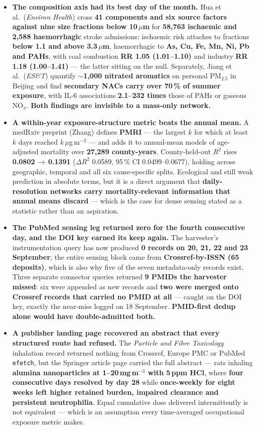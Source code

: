 \documentclass[10pt]{article}
\begin{document}
\begin{itemize}
\item \textbf{The composition axis had its best day of the month.} Hua et al.\
(\textit{Environ Health}) cross \textbf{41 components and six source factors against nine
size fractions below 10\,$\mu$m} for \textbf{58,763 ischaemic and 2,588 haemorrhagic}
stroke admissions: ischaemic risk attaches to fractions \textbf{below 1.1 and above
3.3\,$\mu$m}, haemorrhagic to \textbf{As, Cu, Fe, Mn, Ni, Pb and PAHs}, with coal
combustion \textbf{RR 1.05 (1.01--1.10)} and industry \textbf{RR 1.18 (1.00--1.41)} ---
the latter sitting on the null. Separately, Jiang et al.\ (\textit{ES\&T}) quantify
\textbf{$\sim$1,000 nitrated aromatics} on personal PM$_{2.5}$ in Beijing and find
\textbf{secondary NACs carry over 70\,\% of summer exposure}, with IL-6 associations
\textbf{2.1--232 times} those of PAHs or gaseous NO$_x$. \textbf{Both findings are
invisible to a mass-only network.}

\item \textbf{A within-year exposure-structure metric beats the annual mean.} A medRxiv
preprint (Zhang) defines \textbf{PMRI} --- the largest $k$ for which at least $k$ days
reached $k$\,$\mu$g\,m$^{-3}$ --- and adds it to annual-mean models of age-adjusted
mortality over \textbf{27,289 county-years}. County-held-out $R^2$ rises
\textbf{0.0802\,$\to$\,0.1391} ($\Delta R^2$ 0.0589, 95\,\% CI 0.0499--0.0677), holding
across geographic, temporal and all six cause-specific splits. Ecological and still weak
prediction in absolute terms, but it is a direct argument that \textbf{daily-resolution
networks carry mortality-relevant information that annual means discard} --- which is the
case for dense sensing stated as a statistic rather than an aspiration.

\item \textbf{The PubMed sensing leg returned zero for the fourth consecutive day, and the
DOI key earned its keep again.} The harvester's instrumentation query has now produced
\textbf{0 records on 20, 21, 22 and 23 September}; the entire sensing block came from
\textbf{Crossref-by-ISSN (65 deposits)}, which is also why five of the seven metadata-only
records exist. Three separate connector queries returned \textbf{9 PMIDs the harvester
missed}: six were appended as new records and \textbf{two were merged onto Crossref records
that carried no PMID at all} --- caught on the DOI key, exactly the near-miss logged on
18 September. \textbf{PMID-first dedup alone would have double-admitted both.}

\item \textbf{A publisher landing page recovered an abstract that every structured route
had refused.} The \textit{Particle and Fibre Toxicology} inhalation record returned nothing
from Crossref, Europe PMC or PubMed \texttt{efetch}, but the Springer article page carried
the full abstract --- rats inhaling \textbf{alumina nanoparticles at 1--20\,mg\,m$^{-3}$
with 5\,ppm HCl}, where \textbf{four consecutive days resolved by day 28} while
\textbf{once-weekly for eight weeks left higher retained burden, impaired clearance and
persistent neutrophilia}. Equal cumulative dose delivered intermittently is not equivalent
--- which is an assumption every time-averaged occupational exposure metric makes.


\end{itemize}
\end{document}
